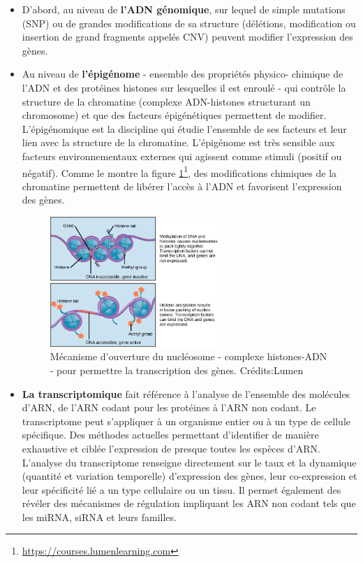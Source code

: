 \begin{itemize}
    \item D'abord, au niveau de \textbf{l'ADN génomique}, sur lequel de simple mutations (SNP) ou de grandes modifications de sa structure (délétions, modification ou insertion de grand fragments appelés CNV) peuvent modifier l'expression des gènes.\\
    
    \item  Au niveau de \textbf{l'épigénome} - ensemble des propriétés physico- chimique de l'ADN et des protéines histones sur lesquelles il est enroulé - qui contrôle la structure de la chromatine (complexe ADN-histones structurant un chromosome) et que des facteurs épigénétiques permettent de modifier. L'épigénomique est la discipline qui étudie l'ensemble de ses facteurs et leur lien avec la structure de la chromatine. L'épigénome est très sensible aux facteurs environnementaux externes qui agissent comme stimuli (positif ou négatif). Comme le montre la figure \ref{fig:epigenet}\footnote{\url{https://courses.lumenlearning.com}}, des modifications chimiques de la chromatine permettent de libérer l'accès à l'ADN et favorisent l'expression des gènes.
    
    \begin{figure}[!ht]
    \centering
    \includegraphics[width=0.6\textwidth]{hdr_manuscript/Figures/epigenet.png}
    \caption[Mécanisme d'ouverture du nucléosome]{Mécanisme d'ouverture du nucléosome - complexe histones-ADN - pour permettre la transcription des gènes. Crédits:Lumen}
    \label{fig:epigenet}
    \end{figure}

    \item \textbf{La transcriptomique} fait référence à l'analyse de l'ensemble des molécules d'ARN, de l'ARN codant pour les protéines à l'ARN non codant. Le transcriptome peut s’appliquer à un organisme entier ou à un type de cellule spécifique. Des méthodes actuelles permettant d'identifier de manière exhaustive et ciblée l'expression de presque toutes les espèces d'ARN. L'analyse du transcriptome renseigne directement sur le taux et la dynamique (quantité et variation temporelle) d'expression des gènes, leur co-expression et leur spécificité lié a un type cellulaire ou un tissu. Il permet également des révéler des mécanismes de régulation impliquant les ARN non codant tels que les miRNA, siRNA et leurs familles.  \\
    

\end{itemize}
